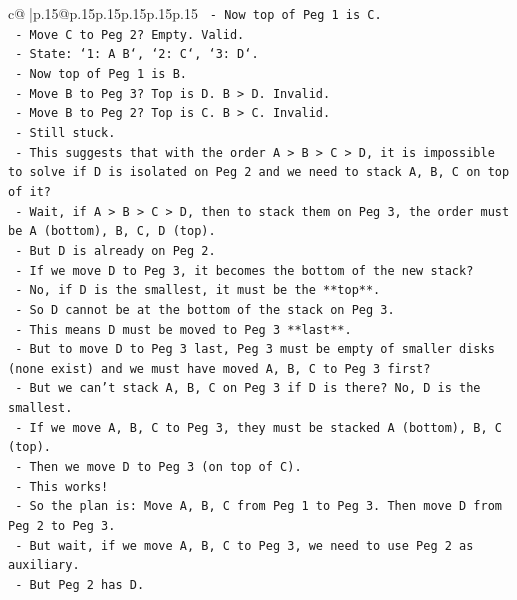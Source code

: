 \documentclass{article}
\begin{document}
{\begin{supertabular}{c@{$\;$}|p{.15\linewidth}@{}p{.15\linewidth}p{.15\linewidth}p{.15\linewidth}p{.15\linewidth}p{.15\linewidth}}
{{{\texttt{            {-} Now top of Peg 1 is C.} \\
\texttt{            {-} Move C to Peg 2? Empty. Valid.} \\
\texttt{            {-} State: `1: A B`, `2: C`, `3: D`.} \\
\texttt{            {-} Now top of Peg 1 is B.} \\
\texttt{            {-} Move B to Peg 3? Top is D. B > D. Invalid.} \\
\texttt{            {-} Move B to Peg 2? Top is C. B > C. Invalid.} \\
\texttt{            {-} Still stuck.} \\
\texttt{            {-} This suggests that with the order A > B > C > D, it is impossible to solve if D is isolated on Peg 2 and we need to stack A, B, C on top of it?} \\
\texttt{            {-} Wait, if A > B > C > D, then to stack them on Peg 3, the order must be A (bottom), B, C, D (top).} \\
\texttt{            {-} But D is already on Peg 2.} \\
\texttt{            {-} If we move D to Peg 3, it becomes the bottom of the new stack?} \\
\texttt{            {-} No, if D is the smallest, it must be the **top**.} \\
\texttt{            {-} So D cannot be at the bottom of the stack on Peg 3.} \\
\texttt{            {-} This means D must be moved to Peg 3 **last**.} \\
\texttt{            {-} But to move D to Peg 3 last, Peg 3 must be empty of smaller disks (none exist) and we must have moved A, B, C to Peg 3 first?} \\
\texttt{            {-} But we can't stack A, B, C on Peg 3 if D is there? No, D is the smallest.} \\
\texttt{            {-} If we move A, B, C to Peg 3, they must be stacked A (bottom), B, C (top).} \\
\texttt{            {-} Then we move D to Peg 3 (on top of C).} \\
\texttt{            {-} This works!} \\
\texttt{            {-} So the plan is: Move A, B, C from Peg 1 to Peg 3. Then move D from Peg 2 to Peg 3.} \\
\texttt{            {-} But wait, if we move A, B, C to Peg 3, we need to use Peg 2 as auxiliary.} \\
\texttt{            {-} But Peg 2 has D.} \\
}}}
\end{supertabular}}
\end{document}
